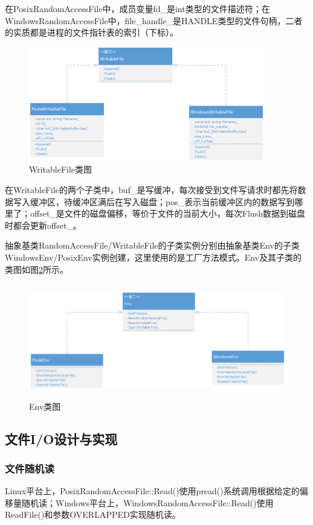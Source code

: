 \documentclass[bachelor]{thesis-uestc}
\begin{document}
在PosixRandomAccessFile中，成员变量fd\_是int类型的文件描述符；在WindowsRandomAccessFile中，file\_handle\_是HANDLE类型的文件句柄，二者的实质都是进程的文件指针表的索引（下标）。

\begin{figure}[htbp]
	\centering\includegraphics[height=5cm]{images/writablefile.png}
	\caption{WritableFile类图}
	\label{fig:writablefile}
\end{figure}

在WritableFile的两个子类中，buf\_是写缓冲，每次接受到文件写请求时都先将数据写入缓冲区，待缓冲区满后在写入磁盘；pos\_表示当前缓冲区内的数据写到哪里了；offset\_是文件的磁盘偏移，等价于文件的当前大小，每次Flush数据到磁盘时都会更新offset\_。

抽象基类RandomAccessFile/WritableFile的子类实例分别由抽象基类Env的子类WindowsEnv/PosixEnv实例创建，这里使用的是工厂方法模式。Env及其子类的类图如图\ref{fig:env}所示。

\begin{figure}[htbp]
	\centering\includegraphics[height=5cm]{images/env.png}
	\caption{Env类图}
	\label{fig:env}
\end{figure}

\subsection{文件I/O设计与实现}
\subsubsection{文件随机读}
Linux平台上，PosixRandomAccessFile::Read()使用pread()系统调用根据给定的偏移量随机读；Windows平台上，WindowsRandomAccessFile::Read()使用ReadFile()和参数OVERLAPPED实现随机读。
\end{document}
